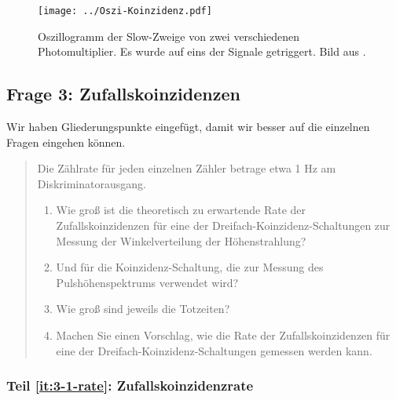 \documentclass[11pt, ngerman, fleqn, DIV=15, headinclude, BCOR=2cm]{scrreprt}
\begin{document}
\begin{figure}[htbp]
    \centering
    \texttt{[image: ../Oszi-Koinzidenz.pdf]}
    \caption{%
        Oszillogramm der Slow-Zweige von zwei verschiedenen Photomultiplier. Es
        wurde auf eins der Signale getriggert. Bild aus
        \parencite[Abbildung~2.24]{Ueding/525}.
    }
    \label{fig:oszi-koinzidenz}
\end{figure}

\subsection{Frage 3: Zufallskoinzidenzen}

Wir haben Gliederungspunkte eingefügt, damit wir besser auf die einzelnen
Fragen eingehen können.

\begin{quote}
    Die Zählrate für jeden einzelnen Zähler betrage etwa 1 Hz am
    Diskriminatorausgang.
    \begin{enumerate}
        \item
            \label{it:3-1-rate}
            Wie groß ist die theoretisch zu erwartende Rate der
            Zufallskoinzidenzen für eine der Dreifach-Koinzidenz-Schaltungen
            zur Messung der Winkelverteilung der Höhenstrahlung?

        \item
            \label{it:3-1-puls}
            Und für die Koinzidenz-Schaltung, die zur Messung des
            Pulshöhenspektrums verwendet wird?

        \item
            \label{it:3-1-tot}
            Wie groß sind jeweils die Totzeiten?

        \item
            \label{it:3-1-vorschlag}
            Machen Sie einen Vorschlag, wie die Rate der Zufallskoinzidenzen
            für eine der Dreifach-Koinzidenz-Schaltungen gemessen werden kann.
    \end{enumerate}
\end{quote}

\subsubsection{Teil \ref{it:3-1-rate}: Zufallskoinzidenzrate}

\newcommand\DtM{\Deltaup t_\text M}
\newcommand\DtO{\Deltaup t_\text O}
\newcommand\DtU{\Deltaup t_\text U}
\end{document}
